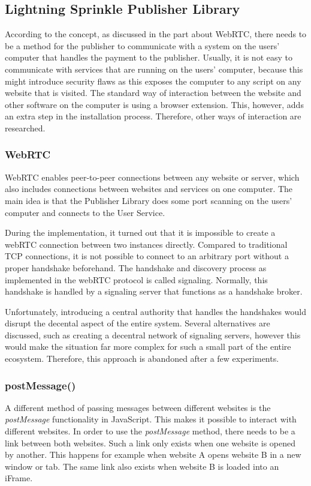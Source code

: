 \subsection{Lightning Sprinkle Publisher Library}
According to the concept, as discussed in the part about WebRTC, there needs to be a method for the publisher to communicate with a system on the users' computer that handles the payment to the publisher. Usually, it is not easy to communicate with services that are running on the users' computer, because this might introduce security flaws as this exposes the computer to any script on any website that is visited. The standard way of interaction between the website and other software on the computer is using a browser extension. This, however, adds an extra step in the installation process. Therefore, other ways of interaction are researched.

\subsubsection{WebRTC}

WebRTC enables peer-to-peer connections between any website or server, which also includes connections between websites and services on one computer. The main idea is that the Publisher Library does some port scanning on the users' computer and connects to the User Service.

During the implementation, it turned out that it is impossible to create a webRTC connection between two instances directly. Compared to traditional TCP connections, it is not possible to connect to an arbitrary port without a proper handshake beforehand. The handshake and discovery process as implemented in the webRTC protocol is called signaling. Normally, this handshake is handled by a signaling server that functions as a handshake broker.

Unfortunately, introducing a central authority that handles the handshakes would disrupt the decental aspect of the entire system. Several alternatives are discussed, such as creating a decentral network of signaling servers, however this would make the situation far more complex for such a small part of the entire ecosystem. Therefore, this approach is abandoned after a few experiments.

\subsubsection{postMessage()}
A different method of passing messages between different websites is the \textit{postMessage} functionality in JavaScript. This makes it possible to interact with different websites. In order to use the \textit{postMessage} method, there needs to be a link between both websites. Such a link only exists when one website is opened by another. This happens for example when website A opens website B in a new window or tab. The same link also exists when website B is loaded into an iFrame. 

